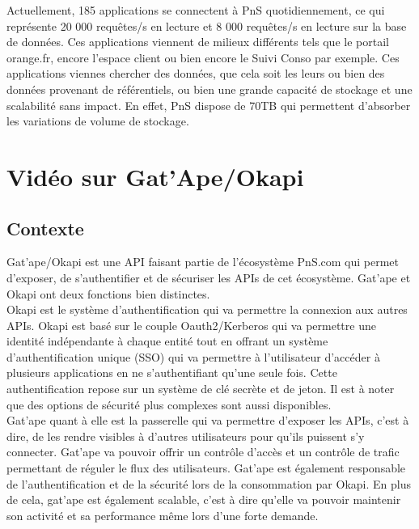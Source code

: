 Actuellement, 185 applications se connectent à PnS quotidiennement, ce qui représente 20 000 requêtes/s en lecture et 8 000 requêtes/s en lecture sur la base de données. Ces applications viennent de milieux différents tels que le portail orange.fr, encore l'espace client ou bien encore le Suivi Conso par exemple. Ces applications viennes chercher des données, que cela soit les leurs ou bien des données provenant de référentiels, ou bien une grande capacité de stockage et une scalabilité sans impact. En effet, PnS dispose de 70TB qui permettent d'absorber les variations de volume de stockage.

\section{Vidéo sur Gat'Ape/Okapi}

\subsection{Contexte}
Gat'ape/Okapi est une API faisant partie de l'écosystème PnS.com qui permet d'exposer, de s'authentifier et de sécuriser les APIs de cet écosystème. Gat'ape et Okapi ont deux fonctions bien distinctes.\\

Okapi est le système d'authentification qui va permettre la connexion aux autres APIs. Okapi est basé sur le couple Oauth2/Kerberos qui va permettre une identité indépendante à chaque entité tout en offrant un système d'authentification unique (SSO) qui va permettre à l'utilisateur d'accéder à plusieurs applications en ne s'authentifiant qu'une seule fois. Cette authentification repose sur un système de clé secrète et de jeton. Il est à noter que des options de sécurité plus complexes sont aussi disponibles.\\

Gat'ape quant à elle est la passerelle qui va permettre d'exposer les APIs, c'est à dire, de les rendre visibles à d'autres utilisateurs pour qu'ils puissent s'y connecter. Gat'ape va pouvoir offrir un contrôle d'accès et un contrôle de trafic permettant de réguler le flux des utilisateurs. Gat'ape est également responsable  de l'authentification et de la sécurité lors de la consommation par Okapi. En plus de cela, gat'ape est également scalable, c'est à dire qu'elle va pouvoir maintenir son activité et sa performance même lors d'une forte demande.\\

